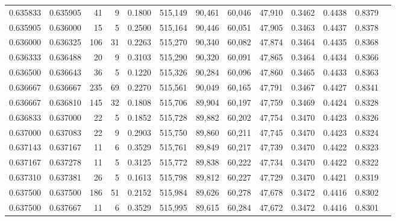 \begin{tabular}{rrrrrrrrrrrrr}
0.635833 & 0.635905 &    41 &   9 &                                     0.1800 & 515,149 &  90,461 &  60,046 &  47,910 & 0.3462 & 0.4438 & 0.8379 \\
0.635905 & 0.636000 &    15 &   5 &                                     0.2500 & 515,164 &  90,446 &  60,051 &  47,905 & 0.3463 & 0.4437 & 0.8378 \\
0.636000 & 0.636325 &   106 &  31 &                                     0.2263 & 515,270 &  90,340 &  60,082 &  47,874 & 0.3464 & 0.4435 & 0.8368 \\
0.636333 & 0.636488 &    20 &   9 &                                     0.3103 & 515,290 &  90,320 &  60,091 &  47,865 & 0.3464 & 0.4434 & 0.8366 \\
0.636500 & 0.636643 &    36 &   5 &                                     0.1220 & 515,326 &  90,284 &  60,096 &  47,860 & 0.3465 & 0.4433 & 0.8363 \\
0.636667 & 0.636667 &   235 &  69 &                                     0.2270 & 515,561 &  90,049 &  60,165 &  47,791 & 0.3467 & 0.4427 & 0.8341 \\
0.636667 & 0.636810 &   145 &  32 &                                     0.1808 & 515,706 &  89,904 &  60,197 &  47,759 & 0.3469 & 0.4424 & 0.8328 \\
0.636833 & 0.637000 &    22 &   5 &                                     0.1852 & 515,728 &  89,882 &  60,202 &  47,754 & 0.3470 & 0.4423 & 0.8326 \\
0.637000 & 0.637083 &    22 &   9 &                                     0.2903 & 515,750 &  89,860 &  60,211 &  47,745 & 0.3470 & 0.4423 & 0.8324 \\
0.637143 & 0.637167 &    11 &   6 &                                     0.3529 & 515,761 &  89,849 &  60,217 &  47,739 & 0.3470 & 0.4422 & 0.8323 \\
0.637167 & 0.637278 &    11 &   5 &                                     0.3125 & 515,772 &  89,838 &  60,222 &  47,734 & 0.3470 & 0.4422 & 0.8322 \\
0.637310 & 0.637381 &    26 &   5 &                                     0.1613 & 515,798 &  89,812 &  60,227 &  47,729 & 0.3470 & 0.4421 & 0.8319 \\
0.637500 & 0.637500 &   186 &  51 &                                     0.2152 & 515,984 &  89,626 &  60,278 &  47,678 & 0.3472 & 0.4416 & 0.8302 \\
0.637500 & 0.637667 &    11 &   6 &                                     0.3529 & 515,995 &  89,615 &  60,284 &  47,672 & 0.3472 & 0.4416 & 0.8301 \\

\end{tabular}
